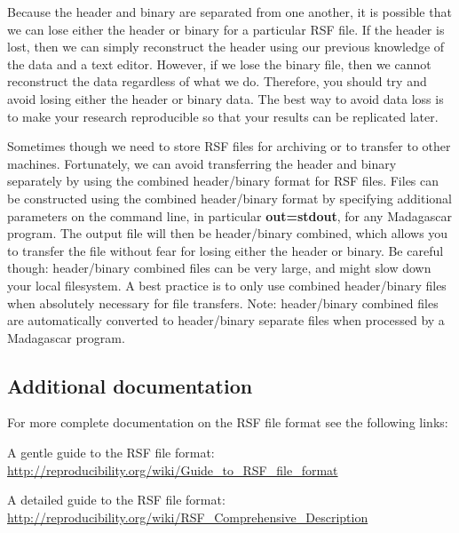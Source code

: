 Because the header and binary are separated from one another, it is possible that we can lose either the header or binary for a particular RSF file.  If the header is lost, then we can simply reconstruct the header using our previous knowledge of the data and a text editor.  However, if we lose the binary file, then we cannot reconstruct the data regardless of what we do.  Therefore, you should try and avoid losing either the header or binary data.  The best way to avoid data loss is to make your research reproducible so that your results can be replicated later.

Sometimes though we need to store RSF files for archiving or to transfer to other machines.  Fortunately, we can avoid transferring the header and binary separately by using the combined header/binary format for RSF files.  Files can be constructed using the combined header/binary format by specifying additional parameters on the command line, in particular \textbf{out=stdout}, for any Madagascar program.  The output file will then be header/binary combined, which allows you to transfer the file without fear for losing either the header or binary.  Be careful though: header/binary combined files can be very large, and might slow down your local filesystem.  A best practice is to only use combined header/binary files when absolutely necessary for file transfers.  Note: header/binary combined files are automatically converted to header/binary separate files when processed by a Madagascar program.


\subsection{Additional documentation}

For more complete documentation on the RSF file format see the following links:

A gentle guide to the RSF file format: \url{http://reproducibility.org/wiki/Guide_to_RSF_file_format}

A detailed guide to the RSF file format: \url{http://reproducibility.org/wiki/RSF_Comprehensive_Description}

